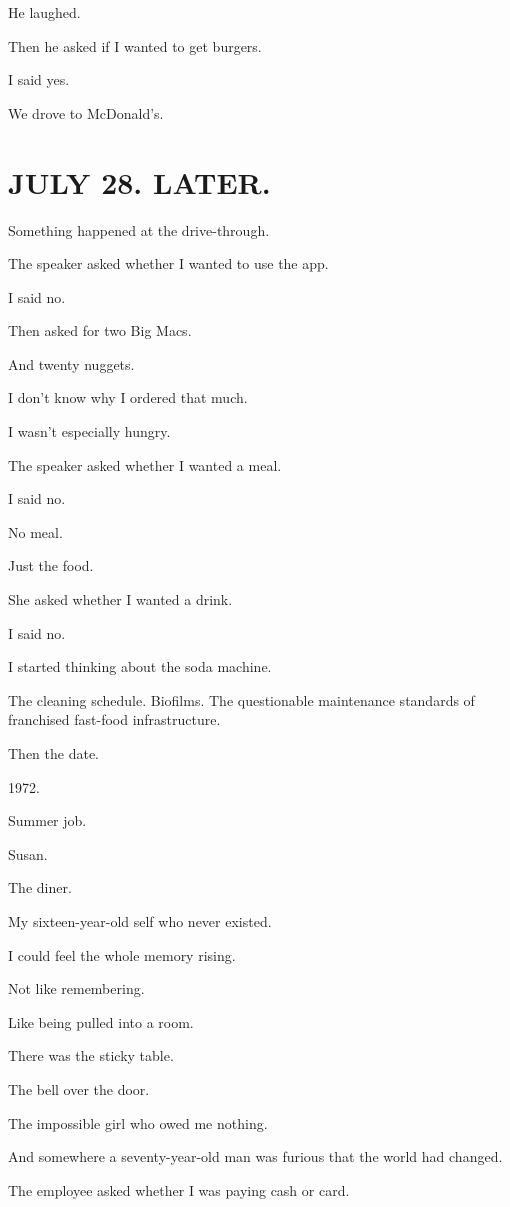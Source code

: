 \documentclass[11pt,oneside]{book}
\begin{document}
He laughed.

Then he asked if I wanted to get burgers.

I said yes.

We drove to McDonald's.

\section*{JULY 28. LATER.}

Something happened at the drive-through.

The speaker asked whether I wanted to use the app.

I said no.

Then asked for two Big Macs.

And twenty nuggets.

I don't know why I ordered that much.

I wasn't especially hungry.

The speaker asked whether I wanted a meal.

I said no.

No meal.

Just the food.

She asked whether I wanted a drink.

I said no.

I started thinking about the soda machine.

The cleaning schedule. Biofilms. The questionable maintenance standards of franchised fast-food infrastructure.

Then the date.

1972.

Summer job.

Susan.

The diner.

My sixteen-year-old self who never existed.

I could feel the whole memory rising.

Not like remembering.

Like being pulled into a room.

There was the sticky table.

The bell over the door.

The impossible girl who owed me nothing.

And somewhere a seventy-year-old man was furious that the world had changed.

The employee asked whether I was paying cash or card.
\end{document}
